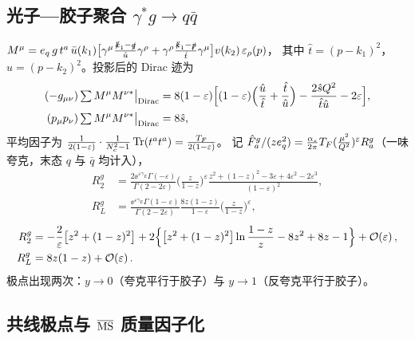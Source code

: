 \subsection{光子—胶子聚合 \texorpdfstring{$\gamma^*g\to q\bar q$}{gamma* g -> q qbar}}

$M^\mu=e_q\,g\,t^a\,\bar u(k_1)\big[\gamma^\mu\frac{\slashed{k}_1-\slashed{q}}{\hat u}\gamma^\rho+\gamma^\rho\frac{\slashed{k}_1-\slashed{p}}{\hat t}\gamma^\mu\big]v(k_2)\,\varepsilon_\rho(p)$，
其中 $\hat t=(p-k_1)^2$，$\hat u=(p-k_2)^2$。投影后的 Dirac 迹为
\begin{align}
(-g_{\mu\nu})\,{\textstyle\sum}\,M^\mu M^{\nu*}\big|_{\rm Dirac}
&=8(1-\varepsilon)\Big[(1-\varepsilon)\Big(\frac{\hat u}{\hat t}+\frac{\hat t}{\hat u}\Big)-\frac{2\hat sQ^2}{\hat t\hat u}-2\varepsilon\Big],
\nonumber\\
(p_\mu p_\nu)\,{\textstyle\sum}\,M^\mu M^{\nu*}\big|_{\rm Dirac}&=8\hat s ,\label{eq:dis1l-meg}
\end{align}
平均因子为 $\frac{1}{2(1-\varepsilon)}\cdot\frac{1}{N_c^2-1}\operatorname{Tr}(t^at^a)=\frac{T_F}{2(1-\varepsilon)}$。
记 $\hat F_a^{g}/(ze_q^2)=\frac{\alpha_s}{2\pi}T_F(\frac{\mu^2}{Q^2})^\varepsilon R_a^g$（一味夸克，末态 $q$ 与 $\bar q$ 均计入），
\begin{align}
R_2^g&=\frac{2\ee^{\varepsilon\gamma_E}\Gamma(-\varepsilon)}{\Gamma(2-2\varepsilon)}\Big(\frac{z}{1-z}\Big)^{\varepsilon}
\frac{z^2+(1-z)^2-3\varepsilon+4\varepsilon^2-2\varepsilon^3}{(1-\varepsilon)^2},\nonumber\\
R_L^g&=\frac{\ee^{\varepsilon\gamma_E}\Gamma(1-\varepsilon)}{\Gamma(2-2\varepsilon)}\frac{8z(1-z)}{1-\varepsilon}\Big(\frac{z}{1-z}\Big)^{\varepsilon},
\label{eq:dis1l-Rg}
\end{align}
\begin{align}
R_2^g&=-\frac{2}{\varepsilon}\big[z^2+(1-z)^2\big]+2\Big\{\big[z^2+(1-z)^2\big]\ln\frac{1-z}{z}-8z^2+8z-1\Big\}+\mathcal{O}\!\left(\varepsilon\right),
\nonumber\\
R_L^g&=8z(1-z)+\mathcal{O}\!\left(\varepsilon\right).\label{eq:dis1l-Rgexp}
\end{align}
极点出现两次：$y\to0$（夸克平行于胶子）与 $y\to1$（反夸克平行于胶子）。

\subsection{共线极点与 \texorpdfstring{$\overline{\mathrm{MS}}$}{MS-bar} 质量因子化}

